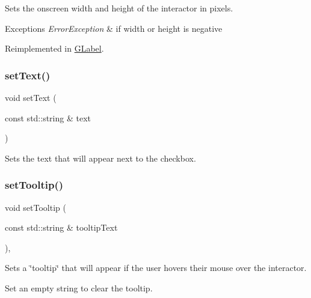 Sets the onscreen width and height of the interactor in pixels. 


\begin{DoxyExceptions}{Exceptions}
{\em Error\+Exception} & if width or height is negative \\
\hline
\end{DoxyExceptions}


Reimplemented in \mbox{\hyperlink{classGLabel_a42d96e60c62d7770993327d7147d77b8}{G\+Label}}.

\mbox{\label{classGCheckBox_ac1ae51949d41ee9054634be5967d91b8}} 
\subsubsection{\texorpdfstring{set\+Text()}{setText()}}
{\footnotesize\ttfamily void set\+Text (\begin{DoxyParamCaption}\item[{const std\+::string \&}]{text }\end{DoxyParamCaption})\hspace{0.3cm}{\ttfamily [virtual]}}



Sets the text that will appear next to the checkbox. 

\mbox{\label{classGInteractor_a039e0e49beaecc275efce02d416acea8}} 
\subsubsection{\texorpdfstring{set\+Tooltip()}{setTooltip()}}
{\footnotesize\ttfamily void set\+Tooltip (\begin{DoxyParamCaption}\item[{const std\+::string \&}]{tooltip\+Text }\end{DoxyParamCaption})\hspace{0.3cm}{\ttfamily [virtual]}, {\ttfamily [inherited]}}



Sets a \char`\"{}tooltip\char`\"{} that will appear if the user hovers their mouse over the interactor. 

Set an empty string to clear the tooltip. \mbox{\label{classGInteractor_a18e44e30b31525a243960ca3928125aa}} 
